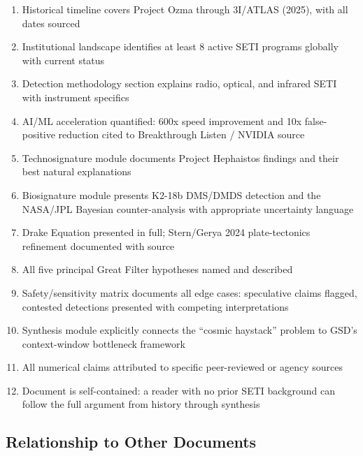 \documentclass[11pt,letterpaper]{article}
\begin{document}
\begin{enumerate}[leftmargin=1.5em]
  \item Historical timeline covers Project Ozma through 3I/ATLAS (2025), with all dates sourced
  \item Institutional landscape identifies at least 8 active SETI programs globally with current status
  \item Detection methodology section explains radio, optical, and infrared SETI with instrument specifics
  \item AI/ML acceleration quantified: 600x speed improvement and 10x false-positive reduction cited to Breakthrough Listen / NVIDIA source
  \item Technosignature module documents Project Hephaistos findings and their best natural explanations
  \item Biosignature module presents K2-18b DMS/DMDS detection and the NASA/JPL Bayesian counter-analysis with appropriate uncertainty language
  \item Drake Equation presented in full; Stern/Gerya 2024 plate-tectonics refinement documented with source
  \item All five principal Great Filter hypotheses named and described
  \item Safety/sensitivity matrix documents all edge cases: speculative claims flagged, contested detections presented with competing interpretations
  \item Synthesis module explicitly connects the ``cosmic haystack'' problem to GSD's context-window bottleneck framework
  \item All numerical claims attributed to specific peer-reviewed or agency sources
  \item Document is self-contained: a reader with no prior SETI background can follow the full argument from history through synthesis
\end{enumerate}

\subsection{Relationship to Other Documents}
\end{document}
